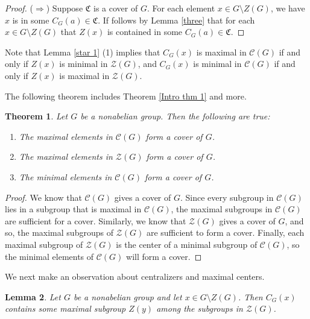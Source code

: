 \documentclass[12pt]{amsart}
\newtheorem{theorem}{Theorem}[section]
\newtheorem{lemma}[theorem]{Lemma}
\begin{document}
{\begin{proof}
($\Rightarrow$) Suppose $\mathfrak{C}$ is a cover of $G$.  For each element $x \in G \setminus {Z}(G)$, we have $x$ is in some ${C}_G (a) \in \mathfrak{C}$.  If follows by Lemma \ref{three} that for each $x \in G \setminus {Z}(G)$ that ${Z}(x)$ is contained in some ${C}_G(a) \in \mathfrak{C}$.  
\end{proof}

Note that Lemma \ref{star 1} (1) implies that $C_G (x)$ is maximal in $\mathcal{C} (G)$ if and only if $Z(x)$ is minimal in $\mathcal {Z} (G)$, and $C_G (x)$ is minimal in $\mathcal{C} (G)$ if and only if $Z(x)$ is maximal in $\mathcal {Z} (G)$.

The following theorem includes Theorem \ref{Intro thm 1} and more.

\begin{theorem}
Let $G$ be a nonabelian group.  Then the following are true:
\begin{enumerate}
\item The maximal elements in $\mathcal {C} (G)$ form a cover of $G$.
\item The maximal elements in $\mathcal {Z} (G)$ form a cover of $G$.
\item The minimal elements in $\mathcal {C} (G)$ form a cover of $G$.
\end{enumerate}
\end{theorem}

\begin{proof}
We know that $\mathcal{C} (G)$ gives a cover of $G$.   Since every subgroup in $\mathcal{C} (G)$ lies in a subgroup that is maximal in $\mathcal{C} (G)$, the maximal subgroups in $\mathcal {C} (G)$ are sufficient for a cover.  Similarly, we know that $\mathcal{Z} (G)$ gives a cover of $G$, and so, the maximal subgroups of $\mathcal {Z} (G)$ are sufficient to form a cover.  Finally, each maximal subgroup of $\mathcal{Z} (G)$ is the center of a minimal subgroup of $\mathcal{C} (G)$, so the minimal elements of $\mathcal{C} (G)$ will form a cover.
\end{proof}

We next make an observation about centralizers and maximal centers.

\begin{lemma} \label{maximal containnment}
Let $G$ be a nonabelian group and let $x \in G \setminus Z (G)$.  Then $C_G (x)$ contains some maximal subgroup $Z(y)$ among the subgroups in $\mathcal{Z} (G)$.
\end{lemma}

}
\end{document}
